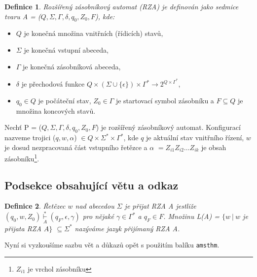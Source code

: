\documentclass[a4paper, twocolumn, 11pt]{article}
\newtheorem{definice}{Definice}
\begin{document}
        \begin{definice}
        Rozšířený zásobníkový automat (RZA) je definován jako sedmice tvaru A = ($Q, \Sigma, \Gamma, \delta, q_0, Z_0, F$), kde:
        \end{definice}
        
        \begin{itemize}
            \item $Q $ je konečná množina vnitřních (řídicích) stavů,
            \item $\Sigma $ je konečná vstupní abeceda,
            \item $\Gamma $ je konečná zásobníková abeceda,
            \item $\delta $ je přechodová funkce \(Q\times(\Sigma\cup\{\epsilon\})\times\Gamma^*\to
            2^{Q\times\Gamma^*}\),
            \item $q_0 \in Q  $ je počáteční stav, $Z_0 \in \Gamma $ je startovací symbol zásobníku a $F \subseteq Q $ je množina koncových stavů.
        \end{itemize}
        
    \par
    
    Nechť P = ($Q, \Sigma, \Gamma, \delta, q_0, Z_0, F$) je rozšířený zásobníkový automat. Konfigurací nazveme trojici ($q, w, \alpha $) $\in Q\times\Sigma^*\times\Gamma^* $, kde $q $ je aktuální stav vnitřního řízení, $w $ je dosud nezpracovaná část vstupního řetězce a $\alpha $
    $ = Z_{i1} Z_{i2} \dots Z_{ik} $ je obsah zásobníku\footnote{$Z_{i1}$ je vrchol zásobníku}.

    \subsection{Podsekce obsahující větu a odkaz}
        \begin{definice}
        Řetězec $w $ nad abecedou $\Sigma $ je přijat RZA A jestliže $(q_0, w, Z_0 )\overset{*}{\underset{A}{\vdash}} (q_F, \epsilon, \gamma) $ pro nějaké $\gamma\in\Gamma^* $
        a $q_F\in F $. Množinu L(A) = $\{ w\ |\ w $ je přijata RZA $ A\} $ 
        $\subseteq\Sigma^* $ nazýváme \textnormal{jazyk přijímaný RZA }A.
        \end{definice}
        
    \par
    \vspace{1em}
    Nyní si vyzkoušíme sazbu vět a důkazů opět s použitím balíku \verb=amsthm=.
    
\end{document}
